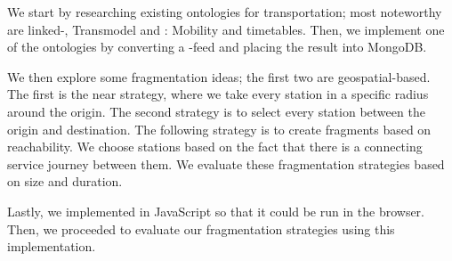 We start by researching existing ontologies for transportation; most noteworthy are linked-\cite{noauthor_opentransportlinked-gtfs_2023}, Transmodel \cite{noauthor_transmodel_nodate-1} and : Mobility and timetables\cite{noauthor_oslo_2023}. Then, we implement one of the ontologies by converting a -feed and placing the result into MongoDB\cite{noauthor_mongodb_nodate}. 

We then explore some fragmentation ideas; the first two are geospatial-based. The first is the near strategy, where we take every station in a specific radius around the origin. The second strategy is to select every station between the origin and destination. The following strategy is to create fragments based on reachability. We choose stations based on the fact that there is a connecting service journey between them. We evaluate these fragmentation strategies based on size and duration.

Lastly, we implemented  in JavaScript so that it could be run in the browser. Then, we proceeded to evaluate our fragmentation strategies using this implementation.

